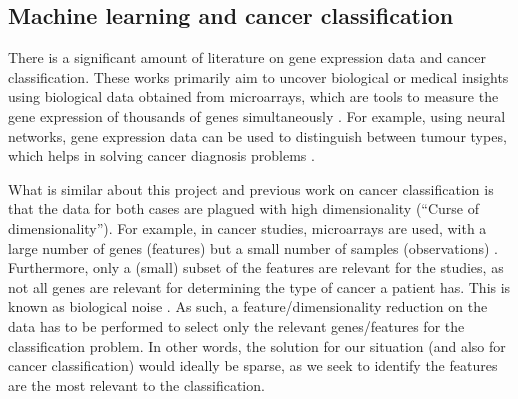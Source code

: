 \documentclass[12pt, twoside, a4paper]{article}
\begin{document}





\subsection{Machine learning and cancer classification} \label{bg_cancer}

There is a significant amount of literature on gene expression data and cancer classification. These works primarily aim to uncover biological or medical insights using biological data obtained from microarrays, which are tools to measure the
gene expression of thousands of genes simultaneously \citep{RefWorks:79}. For example, using neural networks, gene expression data can be used to distinguish between tumour types, which helps in solving cancer diagnosis problems \citep{RefWorks:80, RefWorks:88}.

What is similar about this project and previous work on cancer classification is that the data for both cases are plagued with high dimensionality (``Curse of dimensionality''). For example, in cancer studies, microarrays are used, with a large number of genes (features) but a small number of samples (observations) \cite{RefWorks:88}. Furthermore, only a (small) subset of the features are relevant for the studies, as not all genes are relevant for determining the type of cancer a patient has. This is known as biological noise \cite{RefWorks:89}. As such, a feature/dimensionality reduction on the data has to be performed to select only the relevant genes/features for the classification problem. In other words, the solution for our situation (and also for cancer classification) would ideally be sparse, as we seek to identify the features are the most relevant to the classification.
\end{document}
